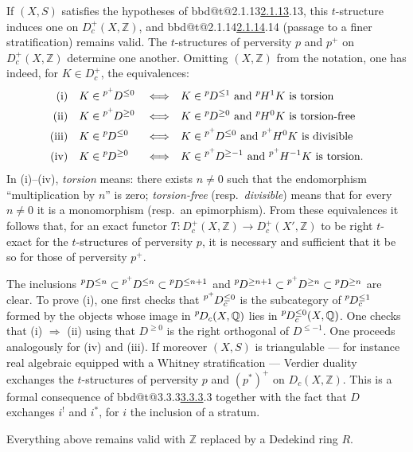 \documentclass[12pt,oneside]{amsbook}
\makeatletter
\DeclareRobustCommand{\rn}[1]{%
  \ifcsname bbd@t@#1\endcsname\hyperlink{bbd:#1}{#1}\else#1\fi}
\theoremstyle{plain}
\theoremstyle{definition}
\newcommand{\Zb}{\mathbb{Z}}  \newcommand{\Qb}{\mathbb{Q}}
\newcommand{\lsup}[1]{{\vphantom{X}}^{#1}\mkern-1.5mu}
\newcommand{\pD}{\lsup{p}D}
\newcommand{\ph}{\lsup{p}H}
\newcommand{\ptD}{\lsup{p^{+}}D}
\newcommand{\ptH}{\lsup{p^{+}}H}
\makeatother
\begin{document}
If $(X,S)$ satisfies the hypotheses of \rn{2.1.13}, this $t$-structure induces one on $D_c^{+}(X,\Zb)$, and \rn{2.1.14} (passage to a finer stratification) remains valid. The $t$-structures of perversity $p$ and $p^{+}$ on $D_c^{+}(X,\Zb)$ determine one another. Omitting $(X,\Zb)$ from the notation, one has indeed, for $K \in D_c^{+}$, the equivalences: {\small
\begin{align*}
\text{(i)}&\quad K \in \ptD^{\le 0} &&\Longleftrightarrow&& K \in \pD^{\le 1} \ \text{and}\ \ph^1K \ \text{is torsion}\\
\text{(ii)}&\quad K \in \ptD^{\ge 0} &&\Longleftrightarrow&& K \in \pD^{\ge 0} \ \text{and}\ \ph^0K \ \text{is torsion-free}\\
\text{(iii)}&\quad K \in \pD^{\le 0} &&\Longleftrightarrow&& K \in \ptD^{\le 0} \ \text{and}\ \ptH^0K \ \text{is divisible}\\
\text{(iv)}&\quad K \in \pD^{\ge 0} &&\Longleftrightarrow&& K \in \ptD^{\ge -1} \ \text{and}\ \ptH^{-1}K \ \text{is torsion.}
\end{align*}
} In (i)--(iv), \emph{torsion} means: there exists $n \ne 0$ such that the endomorphism ``multiplication by $n$'' is zero; \emph{torsion-free} (resp.\ \emph{divisible}) means that for every $n \ne 0$ it is a monomorphism (resp.\ an epimorphism). From these equivalences it follows that, for an exact functor $T : D_c^{+}(X,\Zb) \to D_c^{+}(X',\Zb)$ to be right $t$-exact for the $t$-structures of perversity $p$, it is necessary and sufficient that it be so for those of perversity $p^{+}$.

The inclusions $\pD^{\le n} \subset \ptD^{\le n} \subset \pD^{\le n+1}$ and
$\pD^{\ge n+1} \subset \ptD^{\ge n} \subset \pD^{\ge n}$ are clear. To prove (i), one first checks that $\ptD_c^{\le 0}$ is the subcategory of $\pD_c^{\le 1}$ formed by the objects whose image in $\pD_c(X,\Qb)$ lies in $\pD_c^{\le 0}(X,\Qb)$. One checks that (i) $\Rightarrow$ (ii) using that $D^{\ge 0}$ is the right orthogonal of $D^{\le -1}$. One proceeds analogously for (iv) and (iii). If moreover $(X,S)$ is triangulable --- for instance real algebraic equipped with a Whitney stratification --- Verdier duality exchanges the $t$-structures of perversity $p$ and $(p^*)^+$ on $D_c(X,\mathbb{Z})$. This is a formal consequence of \rn{3.3.3} together with the fact that $D$ exchanges $i^!$ and $i^*$, for $i$ the inclusion of a stratum.

Everything above remains valid with $\mathbb{Z}$ replaced by a Dedekind ring $R$.
\end{document}
